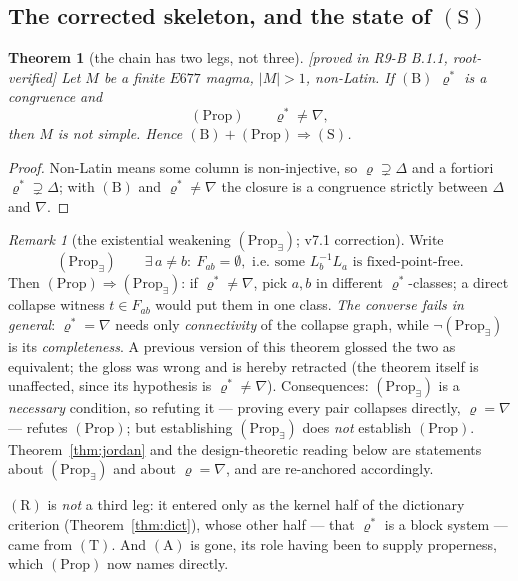 \documentclass[11pt]{article}
\theoremstyle{plain}
\newtheorem{theorem}{Theorem}[section]
\theoremstyle{definition}
\theoremstyle{remark}
\newtheorem*{remark*}{Remark}
\numberwithin{equation}{section}
\newcommand{\statusbox}[1]{{\small\sloppy\textsf{[#1]}}}
\newcommand{\PROVED}[1]{\statusbox{proved in #1, root-verified}}
\begin{document}
\subsection{The corrected skeleton, and the state of $(\mathrm{S})$}\label{sec:skeleton}

\begin{theorem}[the chain has two legs, not three]\label{thm:twolegs}
\PROVED{R9-B B.1.1}
Let $M$ be a finite $E677$ magma, $|M|>1$, non-Latin. If $(\mathrm{B})$
$\varrho^{*}$ is a congruence and
\[
  (\mathrm{Prop})\qquad \varrho^{*}\ne\nabla ,
\]
then $M$ is not simple. Hence $(\mathrm{B})+(\mathrm{Prop})\Rightarrow(\mathrm{S})$.
\end{theorem}

\begin{proof}
Non-Latin means some column is non-injective, so $\varrho\supsetneq\Delta$ and a
fortiori $\varrho^{*}\supsetneq\Delta$; with $(\mathrm{B})$ and
$\varrho^{*}\ne\nabla$ the closure is a congruence strictly between $\Delta$ and
$\nabla$.
\end{proof}

\begin{remark*}[the existential weakening $(\mathrm{Prop}_{\exists})$; v7.1
correction]
Write
\[
  (\mathrm{Prop}_{\exists})\qquad \exists\, a\ne b:\ F_{ab}=\emptyset,
  \text{ i.e.\ some } L_b^{-1}L_a \text{ is fixed-point-free.}
\]
Then $(\mathrm{Prop})\Rightarrow(\mathrm{Prop}_{\exists})$: if
$\varrho^{*}\ne\nabla$, pick $a,b$ in different $\varrho^{*}$-classes; a direct
collapse witness $t\in F_{ab}$ would put them in one class. \emph{The converse
fails in general}: $\varrho^{*}=\nabla$ needs only \emph{connectivity} of the
collapse graph, while $\neg(\mathrm{Prop}_{\exists})$ is its
\emph{completeness}. A previous version of this theorem glossed the two as
equivalent; the gloss was wrong and is hereby retracted (the theorem itself is
unaffected, since its hypothesis is $\varrho^{*}\ne\nabla$). Consequences:
$(\mathrm{Prop}_{\exists})$ is a \emph{necessary} condition, so refuting it ---
proving every pair collapses directly, $\varrho=\nabla$ --- refutes
$(\mathrm{Prop})$; but establishing $(\mathrm{Prop}_{\exists})$ does \emph{not}
establish $(\mathrm{Prop})$. Theorem~\ref{thm:jordan} and the design-theoretic
reading below are statements about $(\mathrm{Prop}_{\exists})$ and about
$\varrho=\nabla$, and are re-anchored accordingly.
\end{remark*}

$(\mathrm{R})$ is \emph{not} a third leg: it entered only as the kernel half of
the dictionary criterion (Theorem~\ref{thm:dict}), whose other half --- that
$\varrho^{*}$ is a block system --- came from $(\mathrm{T})$. And $(\mathrm{A})$
is gone, its role having been to supply properness, which $(\mathrm{Prop})$ now
names directly.
\end{document}
